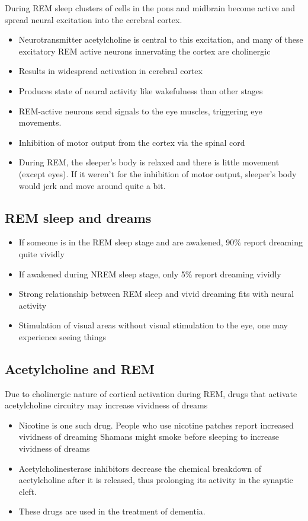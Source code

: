 \documentclass{article}
\begin{document}
During REM sleep clusters of cells in the pons and midbrain become active and spread neural excitation into the cerebral cortex. 
\begin{itemize}
    \item Neurotransmitter acetylcholine is central to this excitation, and many of these excitatory 
    REM active neurons innervating the cortex are cholinergic
    \item Results in widespread activation in cerebral cortex
    \item Produces state of neural activity like wakefulness than other stages
    \item REM-active neurons send signals to the eye muscles, triggering eye movements.
    \item Inhibition of motor output from the cortex via the spinal cord
    \item During REM, the sleeper's body is relaxed and there is little movement (except eyes). If it weren't for the inhibition of motor output, sleeper's body would jerk and move around quite a bit. 
\end{itemize}

\subsection{REM sleep and dreams}
\begin{itemize}
    \item If someone is in the REM sleep stage and are awakened, 90\% report dreaming quite vividly
    \item If awakened during NREM sleep stage, only 5\% report dreaming vividly
    \item Strong relationship between REM sleep and vivid dreaming fits with neural activity
    \item Stimulation of visual areas without visual stimulation to the eye, one may experience seeing things
\end{itemize}

\subsection{Acetylcholine and REM}
Due to cholinergic nature of cortical activation during REM, drugs that activate acetylcholine circuitry may increase vividness of dreams
\begin{itemize}
    \item Nicotine is one such drug. People who use nicotine patches report increased vividness of dreaming
        \subitem Shamans might smoke before sleeping to increase vividness of dreams
    \item Acetylcholinesterase inhibitors decrease the chemical breakdown of acetylcholine after it is released, thus prolonging its activity in the synaptic cleft. 
    \item These drugs are used in the treatment of dementia. 
\end{itemize}
\end{document}

